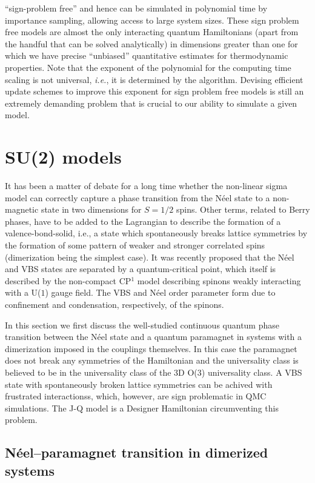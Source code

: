\documentclass[aps,prb,groupedaddress,twocolumn]{revtex4}
\begin{document}
``sign-problem free'' and hence can be simulated in polynomial time by
importance sampling, allowing access to large system sizes. 
These sign problem free models are almost the only interacting quantum
Hamiltonians (apart from the handful that can be solved analytically) in dimensions greater than one for which we have precise ``unbiased''
quantitative estimates for
thermodynamic properties.  
 Note that the exponent of the polynomial for the computing time
 scaling is not universal, {\em i.e.}, it is
determined by the algorithm. Devising efficient update schemes to
improve this exponent for
sign problem free models
is still an extremely demanding problem that is crucial to our ability to
simulate a given model. 


\section{SU(2) models}

It has been a matter of debate for a long time whether the non-linear sigma model can correctly capture a 
phase transition from the N\'eel state to a non-magnetic state in two dimensions for $S=1/2$ spins. Other terms, related to 
Berry phases, have to be added to the Lagrangian to describe the formation of a valence-bond-solid, i.e., a state which 
spontaneously breaks lattice symmetries by the formation of some pattern of weaker and stronger correlated spins (dimerization 
being the simplest case). It was recently proposed that the N\'eel and VBS states are separated by a quantum-critical point, 
which itself is described by the non-compact CP$^1$ model describing spinons weakly interacting with a U($1$) gauge field.
The VBS and N\'eel order parameter form due to confinement and condensation, respectively, of the spinons. 

In this section we first discuss the well-studied continuous quantum phase transition between the N\'eel state and a quantum
paramagnet in systems with a dimerization imposed in the couplings themselves. In this case the paramagnet does not break any
symmetries of the Hamiltonian and the universality class is believed to be in the universality class of the 3D O($3$) universality
class. A VBS state with spontaneously broken lattice symmetries can be achived with frustrated interactionss, which, however, are
sign problematic in QMC simulations. The J-Q model is a Designer Hamiltonian circumventing this problem.

\subsection{N\'eel--paramagnet transition in dimerized systems}
\end{document}
